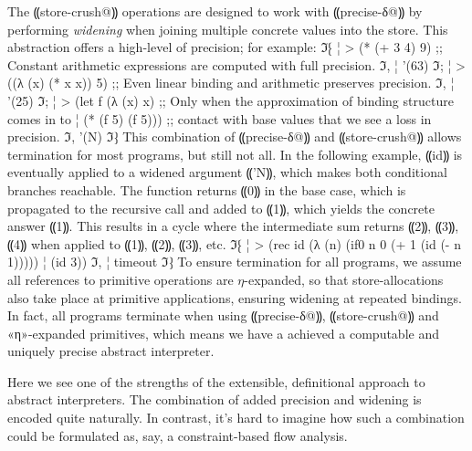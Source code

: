 The ⸨store-crush@⸩ operations are designed to work with ⸨precise-δ@⸩ by
performing \emph{widening} when joining multiple concrete values into the
store. This abstraction offers a high-level of precision; for example:
ℑ⁅
¦ > (* (+ 3 4) 9)        ;; Constant arithmetic expressions are computed with full precision.
ℑ,
¦ '(63)
ℑ;
¦ > ((λ (x) (* x x)) 5)  ;; Even linear binding and arithmetic preserves precision.
ℑ,
¦ '(25)
ℑ;
¦ > (let f (λ (x) x)     ;; Only when the approximation of binding structure comes in to
¦     (* (f 5) (f 5)))   ;; contact with base values that we see a loss in precision.
ℑ,
'(N)
ℑ⁆
This combination of ⸨precise-δ@⸩ and ⸨store-crush@⸩ allows termination for most
programs, but still not all. In the following example, ⸨id⸩ is eventually
applied to a widened argument ⸨'N⸩, which makes both conditional branches
reachable. The function returns ⸨0⸩ in the base case, which is propagated to
the recursive call and added to ⸨1⸩, which yields the concrete answer ⸨1⸩.
This results in a cycle where the intermediate sum returns ⸨2⸩, ⸨3⸩, ⸨4⸩ when
applied to ⸨1⸩, ⸨2⸩, ⸨3⸩, etc.
ℑ⁅
¦ > (rec id (λ (n) (if0 n 0 (+ 1 (id (- n 1)))))
¦     (id 3))
ℑ,
¦ timeout
ℑ⁆
To ensure termination for all programs, we assume all references to
primitive operations are $η$-expanded, so that store-allocations also
take place at primitive applications, ensuring widening at repeated
bindings. In fact, all programs terminate when using ⸨precise-δ@⸩,
⸨store-crush@⸩ and «η»-expanded primitives, which means we have a
achieved a computable and uniquely precise abstract interpreter.

Here we see one of the strengths of the extensible, definitional approach to
abstract interpreters. The combination of added precision and widening is
encoded quite naturally. In contrast, it's hard to imagine how such a
combination could be formulated as, say, a constraint-based flow analysis.
